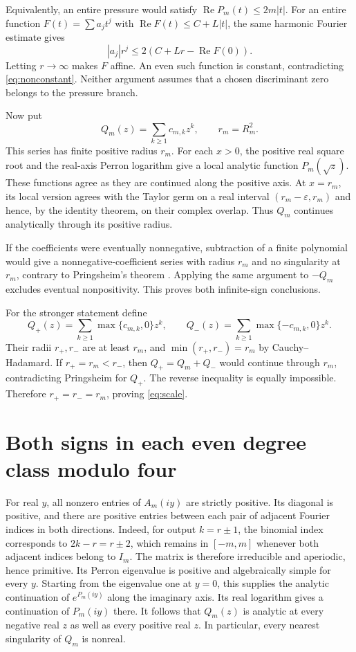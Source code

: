 \documentclass[11pt,a4paper]{article}
\theoremstyle{remark}\newtheorem*{ednote}{Editorial note (ProveIt, 2026-10-01)}
\begin{document}
Equivalently, an entire pressure would satisfy
$\operatorname{Re}P_m(t)\le2m|t|$.
For an entire function $F(t)=\sum a_jt^j$ with $\operatorname{Re}F(t)\le C+L|t|$, the same harmonic Fourier estimate gives
\[
 |a_j|r^j\le2(C+Lr-\operatorname{Re}F(0)).
\]
Letting $r\to\infty$ makes $F$ affine.
An even such function is constant, contradicting \eqref{eq:nonconstant}.
Neither argument assumes that a chosen discriminant zero belongs to the pressure branch.

Now put
\[
 Q_m(z)=\sum_{k\ge1}c_{m,k}z^k,\qquad r_m=R_m^2.
\]
This series has finite positive radius $r_m$.
For each $x>0$, the positive real square root and the real-axis Perron logarithm give a local analytic function $P_m(\sqrt z)$.
These functions agree as they are continued along the positive axis.
At $x=r_m$, its local version agrees with the Taylor germ on a real interval $(r_m-\varepsilon,r_m)$ and hence, by the identity theorem, on their complex overlap.
Thus $Q_m$ continues analytically through its positive radius.

If the coefficients were eventually nonnegative, subtraction of a finite polynomial would give a nonnegative-coefficient series with radius $r_m$ and no singularity at $r_m$, contrary to Pringsheim's theorem \cite[Theorem IV.3(ii)]{FS}.
Applying the same argument to $-Q_m$ excludes eventual nonpositivity.
This proves both infinite-sign conclusions.

For the stronger statement define
\[
 Q_+(z)=\sum_{k\ge1}\max\{c_{m,k},0\}z^k,\qquad
 Q_-(z)=\sum_{k\ge1}\max\{-c_{m,k},0\}z^k.
\]
Their radii $r_+,r_-$ are at least $r_m$, and
$\min(r_+,r_-)=r_m$ by Cauchy--Hadamard.
If $r_+=r_m<r_-$, then $Q_+=Q_m+Q_-$ would continue through $r_m$, contradicting Pringsheim for $Q_+$.
The reverse inequality is equally impossible.
Therefore $r_+=r_-=r_m$, proving \eqref{eq:scale}.

\section{Both signs in each even degree class modulo four}
For real $y$, all nonzero entries of $A_m(iy)$ are strictly positive.
Its diagonal is positive, and there are positive entries between each pair of adjacent Fourier indices in both directions.
Indeed, for output $k=r\pm1$, the binomial index corresponds to $2k-r=r\pm2$, which remains in $[-m,m]$ whenever both adjacent indices belong to $I_m$.
The matrix is therefore irreducible and aperiodic, hence primitive.
Its Perron eigenvalue is positive and algebraically simple for every $y$.
Starting from the eigenvalue one at $y=0$, this supplies the analytic continuation of $e^{P_m(iy)}$ along the imaginary axis.
Its real logarithm gives a continuation of $P_m(iy)$ there.
It follows that $Q_m(z)$ is analytic at every negative real $z$ as well as every positive real $z$.
In particular, every nearest singularity of $Q_m$ is nonreal.
\end{document}
